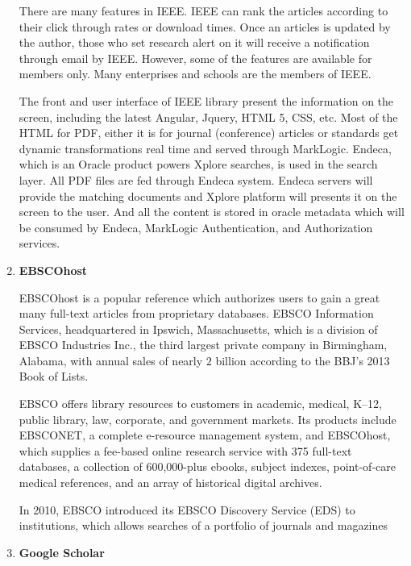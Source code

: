 \begin{enumerate}
	There are many features in IEEE. IEEE can rank the articles according to their click through rates or download times. 
    Once an articles is updated by the author, those who set research alert on it will receive a notification through email by IEEE.
    However, some of the features are available for members only.
    Many enterprises and schools are the members of IEEE.

	
	The front and user interface of IEEE library present the information on the screen, 
	including the latest Angular, Jquery, HTML 5, CSS, etc. 
	Most of the HTML for PDF, either it is for journal (conference) articles or standards get dynamic transformations real time and served through MarkLogic.
	Endeca, which is an Oracle product powers Xplore searches, is used in the search layer.
	All PDF files are fed through Endeca system.
	Endeca servers will provide the matching documents and Xplore platform will presents it on the screen to the user.
	And all the content is stored in oracle metadata which will be consumed by Endeca, MarkLogic Authentication, and Authorization services.
	
	\item\textbf{EBSCOhost}
	\setlength{\parindent}{1em}

	EBSCOhost is a popular reference which authorizes users to gain a great many full-text articles from proprietary databases.
	EBSCO Information Services, headquartered in Ipswich, Massachusetts, 
    which is a division of EBSCO Industries Inc., 
    the third largest private company in Birmingham, Alabama, with annual sales of nearly $2$ billion according to the BBJ's 2013 Book of Lists.

    EBSCO offers library resources to customers in academic, medical, K–12,  
    public library, law, corporate, and government markets. 
	Its products include EBSCONET, a complete e-resource management system,
    and EBSCOhost, which supplies a fee-based online research 
    service with 375 full-text databases, a collection
    of 600,000-plus ebooks, subject indexes, point-of-care 
    medical references, and an array of historical digital archives.

    In 2010, EBSCO introduced its EBSCO Discovery Service (EDS) to institutions,
    which allows searches of a portfolio of journals and magazines

	\item\textbf{Google Scholar}
	\setlength{\parindent}{1em}
	

\end{enumerate}
